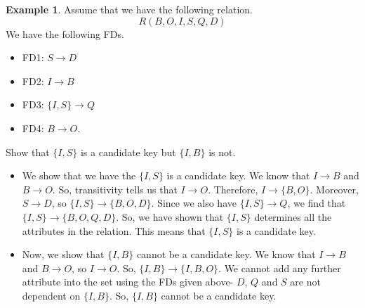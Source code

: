 \documentclass[a4paper, openany]{memoir}
\theoremstyle{definition}
\newtheorem{example}[subsection]{Example}
\begin{document}
    \begin{example}
        Assume that we have the following relation.
        \[R(B, O, I, S, Q, D)\]
        We have the following FDs.
        \begin{itemize}
            \item FD1: $S \to D$
            \item FD2: $I \to B$
            \item FD3: $\{I, S\} \to Q$
            \item FD4: $B \to O$.
        \end{itemize}
        Show that $\{I, S\}$ is a candidate key but $\{I, B\}$ is not.
    \end{example}
    \begin{answer}
        \begin{itemize}
            \item We show that we have the $\{I, S\}$ is a candidate key. We know that $I \to B$ and $B \to O$. So, transitivity tells us that $I \to O$. Therefore, $I \to \{B, O\}$. Moreover, $S \to D$, so $\{I, S\} \to \{B, O, D\}$. Since we also have $\{I, S\} \to Q$, we find that $\{I, S\} \to \{B, O, Q, D\}$. So, we have shown that $\{I, S\}$ determines all the attributes in the relation. This means that $\{I, S\}$ is a candidate key.

            \item Now, we show that $\{I, B\}$ cannot be a candidate key. We know that $I \to B$ and $B \to O$, so $I \to O$. So, $\{I, B\} \to \{I, B, O\}$. We cannot add any further attribute into the set using the FDs given above- $D$, $Q$ and $S$ are not dependent on $\{I, B\}$. So, $\{I, B\}$ cannot be a candidate key.
        \end{itemize}
    \end{answer}
    \newpage
\end{document}
